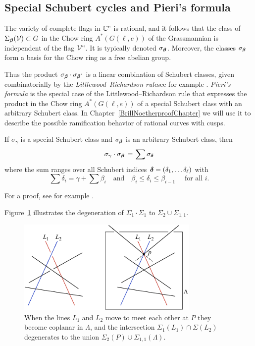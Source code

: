 \subsection*{Special Schubert cycles and Pieri's formula}

\begin{fact}
The variety of complete flags in ${\mathbb C}^e$ is rational, and it follows
%
that the class of $\Sigma_{{\boldsymbol{\beta}}}({\mathcal V})\subset G$
in the 
Chow ring
%
$A^*(G(\ell, e))$ of the 
Grassmannian
%
is independent
of the flag ${\mathcal V}` `$. It is typically denoted $\sigma_{{\boldsymbol{\beta}}}$. Moreover,
the classes $\sigma_{{\boldsymbol{\beta}}}$ form a basis for the Chow ring as a free
abelian group.
\end{fact}

Thus the product $\sigma_\bbeta 
\cdot \sigma_{\smash{\bbeta'}\vphantom\beta}$  %
is a linear
combination of Schubert classes,
given combinatorially by the \emph{Littlewood--Richardson rule}\emdash see
%
for example \cite{MR2247964}.
\emph{Pieri's formula} 
%
is the special
case of the Littlewood--Richardson rule that expresses the product in
the Chow ring $A^*(G(\ell, e))$ of a special Schubert class with an
arbitrary Schubert class.
In Chapter~\ref{BrillNoetherproofChapter} we will use it to describe
the possible ramification behavior of rational curves with cusps.

\begin{proposition}
\label{Pieri}
If $\sigma_\gamma$ is a 
special Schubert class
%
and $\sigma_{{\boldsymbol{\beta}}}$
is an arbitrary Schubert class, then
%
$$
\sigma_\gamma \cdot \sigma_{\bbeta} \; = \; \sum \sigma_{\bdelta}
$$
where the sum ranges over all Schubert indices ${{\boldsymbol{\delta}}} = (\delta_1,
\dots \delta_{\ell})$ with
$$
\sum \delta_i = \gamma + \sum \beta_i \quad \text{and} \quad \beta_i
\leq \delta_i \leq \beta_{i-1}\quad \text{ for all } i
.
$$
\end{proposition}

For a proof, see for example \cite[Section 4.2.4]{3264}.

Figure~\ref{intersection product} illustrates the degeneration of
$\Sigma_1\cdot \Sigma_1$ to $\Sigma_2 \cup \Sigma_{1,1}$.

\begin{figure}[b]
\includegraphics[height=1.8in]{main/Fig12-3}
\caption{When the lines $L_1$ and $L_2$ move to meet each other at $P$
they become coplanar in $\Lambda$,
and the intersection $\Sigma_1(L_1) \cap \Sigma(L_2)$
degenerates to the union $\Sigma_2(P) \cup \Sigma_{1,1}(\Lambda)$.
}
\label{intersection product}
\end{figure}

